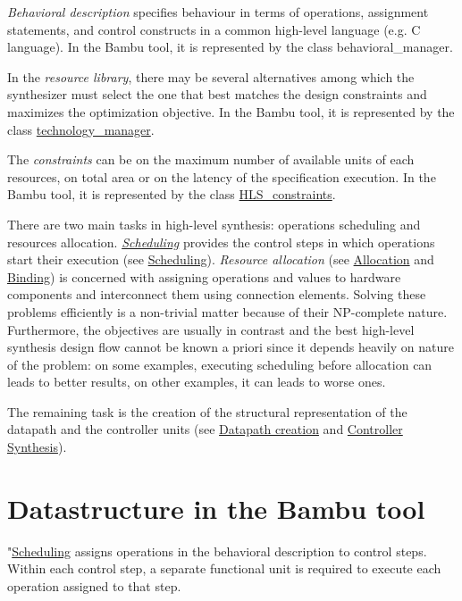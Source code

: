 {\itshape Behavioral description} specifies behaviour in terms of operations, assignment statements, and control constructs in a common high-\/level language (e.\+g. C language). In the Bambu tool, it is represented by the class behavioral\+\_\+manager.

In the {\itshape resource library}, there may be several alternatives among which the synthesizer must select the one that best matches the design constraints and maximizes the optimization objective. In the Bambu tool, it is represented by the class \hyperlink{classtechnology__manager}{technology\+\_\+manager}.

The {\itshape constraints} can be on the maximum number of available units of each resources, on total area or on the latency of the specification execution. In the Bambu tool, it is represented by the class \hyperlink{classHLS__constraints}{H\+L\+S\+\_\+constraints}.

There are two main tasks in high-\/level synthesis\+: operations scheduling and resources allocation. {\itshape \hyperlink{classScheduling}{Scheduling}} provides the control steps in which operations start their execution (see \hyperlink{src_HLS_scheduling_general}{Scheduling}). {\itshape Resource allocation} (see \hyperlink{src_HLS_allocation_page}{Allocation} and \hyperlink{src_HLS_binding_page}{Binding}) is concerned with assigning operations and values to hardware components and interconnect them using connection elements. Solving these problems efficiently is a non-\/trivial matter because of their N\+P-\/complete nature. Furthermore, the objectives are usually in contrast and the best high-\/level synthesis design flow cannot be known a priori since it depends heavily on nature of the problem\+: on some examples, executing scheduling before allocation can leads to better results, on other examples, it can leads to worse ones.

The remaining task is the creation of the structural representation of the datapath and the controller units (see \hyperlink{src_HLS_datapath_page}{Datapath creation} and \hyperlink{src_HLS_controller_fsm}{Controller Synthesis}).\hypertarget{src_HLS_page_HLS_bambu}{}\section{Datastructure in the Bambu tool}\label{src_HLS_page_HLS_bambu}
"\hyperlink{classScheduling}{Scheduling} assigns operations in the behavioral description to control steps. Within each control step, a separate functional unit is required to execute each operation assigned to that step.

